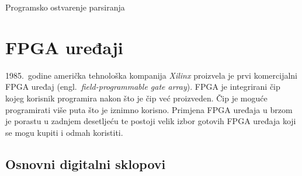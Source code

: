 \documentclass[times, utf8, diplomski]{fer}
\begin{document}
\begin{algorithm}
	\caption{Programsko ostvarenje parsiranja}
\end{algorithm}


\section{FPGA uređaji} \label{sec:fpga}

1985.~godine američka tehnološka kompanija \textit{Xilinx} proizvela je prvi komercijalni FPGA uređaj (engl.~\textit{field-programmable gate array}). FPGA je integrirani čip kojeg korisnik programira nakon što je čip već proizveden. Čip je moguće programirati više puta što je iznimno korisno. Primjena FPGA uređaja u brzom je porastu u zadnjem desetljeću te postoji velik izbor gotovih FPGA uređaja koji se mogu kupiti i odmah koristiti.

\subsection{Osnovni digitalni sklopovi}
\end{document}
